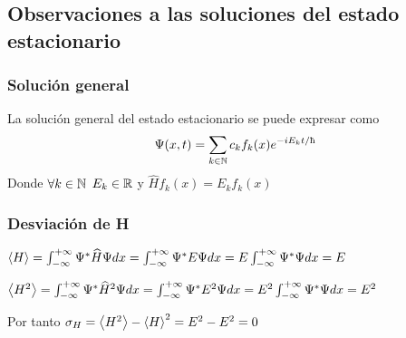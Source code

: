 \subsection{Observaciones a las soluciones del estado estacionario}\label{subsec:observaciones-a-las-soluciones-del-estado-estacionario}

\subsubsection{Solución general}
La solución general del estado estacionario se puede expresar como
\begin{equation}
    \label{eq:solucion_general_estado_estacionario}
    \Psi(x,t)=\sum_{k\in\N}c_k f_k(x)e^{-iE_k t/\hbar}
\end{equation}
Donde $\forall k\in\mathbb{N}$ $E_k\in\mathbb{R}$ y $\widehat{H}f_k(x)=E_k f_k(x)$

\subsubsection{Desviación de H}
$\left\langle H\right\rangle = \int_{-\infty}^{+\infty}\Psi^* \widehat{H}\Psi dx = \int_{-\infty}^{+\infty}\Psi^* E\Psi dx=E\int_{-\infty}^{+\infty}\Psi^* \Psi dx = E$

$\left\langle H^2\right\rangle = \int_{-\infty}^{+\infty}\Psi^* \widehat{H}^2\Psi dx = \int_{-\infty}^{+\infty}\Psi^* E^2\Psi dx=E^2\int_{-\infty}^{+\infty}\Psi^* \Psi dx = E^2$

Por tanto $\sigma_H=\left\langle H^2\right\rangle-\left\langle H\right\rangle^2=E^2-E^2=0$

